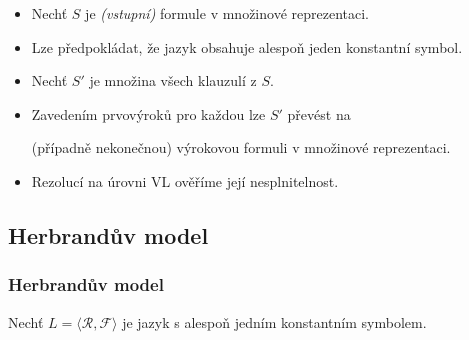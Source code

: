     \begin{itemize}
    \item Nechť $S$ je \emph{(vstupní)} formule v množinové reprezentaci.
    \smallskip
    
    \item Lze předpokládat, že jazyk obsahuje alespoň jeden konstantní symbol.
    \smallskip
    
    \item Nechť $S'$ je množina všech  klauzulí z $S$.
    \smallskip
    
    \item Zavedením prvovýroků pro každou  lze $S'$ převést na
    \smallskip
    
    (případně nekonečnou) výrokovou formuli v množinové reprezentaci.
    \smallskip
    
    \item Rezolucí na úrovni VL ověříme její nesplnitelnost.
    \end{itemize}
    \medskip
    
    \vspace{-2mm}
    
    \vspace{-6mm}
    \vspace{-2mm}
    
    \vspace{-6mm}
    

\subsection{Herbrandův model}\todo

\subsubsection*{Herbrandův model}
    Nechť $L=\langle \mathcal{R},\mathcal{F}\rangle$ je jazyk s alespoň jedním konstantním symbolem.
    \smallskip
    
